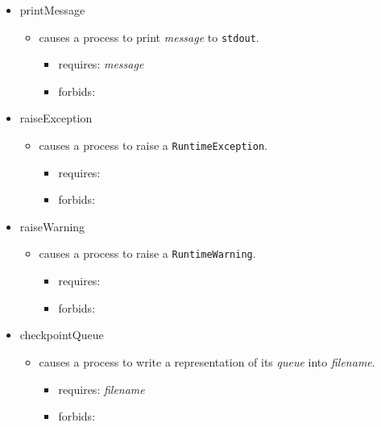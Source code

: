 \documentclass{article}
\newcommand{\stdout}{\texttt{stdout}}
\begin{document}
\begin{itemize}
    \item{printMessage
        \begin{itemize}
            \item{causes a process to print \textit{message} to \stdout.
                \begin{itemize}
                    \item{requires: \textit{message}}
                    \item{forbids: }
                \end{itemize}
                 }
        \end{itemize}
         }
    \item{raiseException
        \begin{itemize}
            \item{causes a process to raise a \texttt{RuntimeException}.
                \begin{itemize}
                    \item{requires: }
                    \item{forbids: }
                \end{itemize}
                 }
        \end{itemize}
         }
    \item{raiseWarning
        \begin{itemize}
            \item{causes a process to raise a \texttt{RuntimeWarning}.
                \begin{itemize}
                    \item{requires: }
                    \item{forbids: }
                \end{itemize}
                 }
        \end{itemize}
         }
    \item{checkpointQueue
        \begin{itemize}
            \item{causes a process to write a representation of its \textit{queue} into \textit{filename}.
                \begin{itemize}
                    \item{requires: \textit{filename}}
                    \item{forbids: }
                \end{itemize}
                 }
        \end{itemize}
}
\end{itemize}
\end{document}
